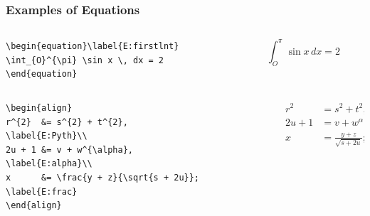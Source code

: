 \documentclass[aspectratio=169]{beamer}
\begin{document}
\begin{frame}[fragile]
\frametitle{Examples of Equations}

%
%
\begin{columns}
    \tiny
    \begin{column}{0.5\textwidth}
        \begin{verbatim}
\begin{equation}\label{E:firstlnt}
\int_{O}^{\pi} \sin x \, dx = 2
\end{equation}
        \end{verbatim}
    \end{column}
    \begin{column}{0.5\textwidth}
\begin{equation}\label{E:firstlnt}
\int_{O}^{\pi} \sin x \, dx = 2
\end{equation}
    \end{column}
    \normalsize
\end{columns}

%
% 
\begin{columns}
    \tiny
    \begin{column}{0.5\textwidth}
        \begin{verbatim}
\begin{align}
r^{2}  &= s^{2} + t^{2},               \label{E:Pyth}\\
2u + 1 &= v + w^{\alpha},              \label{E:alpha}\\
x      &= \frac{y + z}{\sqrt{s + 2u}}; \label{E:frac}
\end{align}
        \end{verbatim}
    \end{column}

    \begin{column}{0.5\textwidth}    
\begin{align}
r^{2}  &= s^{2} + t^{2},               \label{E:Pyth}\\
2u + 1 &= v + w^{\alpha},              \label{E:alpha}\\
x      &= \frac{y + z}{\sqrt{s + 2u}}; \label{E:frac}
\end{align}
    \end{column}
    \normalsize
\end{columns}


\end{frame}
\end{document}
